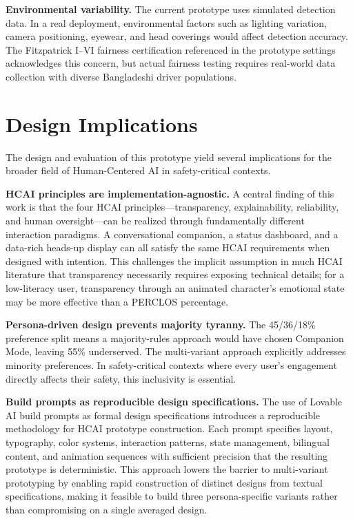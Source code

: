 \documentclass[sigconf]{acmart}
\begin{document}
\textbf{Environmental variability.} The current prototype uses simulated detection data. In a real deployment, environmental factors such as lighting variation, camera positioning, eyewear, and head coverings would affect detection accuracy. The Fitzpatrick I--VI fairness certification referenced in the prototype settings acknowledges this concern, but actual fairness testing requires real-world data collection with diverse Bangladeshi driver populations.


\section{Design Implications}

The design and evaluation of this prototype yield several implications for the broader field of Human-Centered AI in safety-critical contexts.

\textbf{HCAI principles are implementation-agnostic.} A central finding of this work is that the four HCAI principles---transparency, explainability, reliability, and human oversight---can be realized through fundamentally different interaction paradigms. A conversational companion, a status dashboard, and a data-rich heads-up display can all satisfy the same HCAI requirements when designed with intention. This challenges the implicit assumption in much HCAI literature that transparency necessarily requires exposing technical details; for a low-literacy user, transparency through an animated character's emotional state may be more effective than a PERCLOS percentage.

\textbf{Persona-driven design prevents majority tyranny.} The 45/36/18\% preference split means a majority-rules approach would have chosen Companion Mode, leaving 55\% underserved. The multi-variant approach explicitly addresses minority preferences. In safety-critical contexts where every user's engagement directly affects their safety, this inclusivity is essential.

\textbf{Build prompts as reproducible design specifications.} The use of Lovable AI build prompts as formal design specifications introduces a reproducible methodology for HCAI prototype construction. Each prompt specifies layout, typography, color systems, interaction patterns, state management, bilingual content, and animation sequences with sufficient precision that the resulting prototype is deterministic. This approach lowers the barrier to multi-variant prototyping by enabling rapid construction of distinct designs from textual specifications, making it feasible to build three persona-specific variants rather than compromising on a single averaged design.
\end{document}

